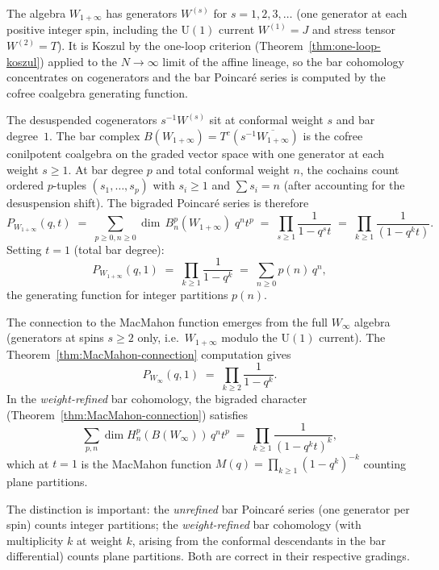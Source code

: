 \begin{computation}
\label{comp:bar-poincare-w1infty}
The algebra $W_{1+\infty}$ has generators $W^{(s)}$ for $s = 1, 2, 3,
\ldots$ (one generator at each positive integer spin, including the
$\mathrm{U}(1)$ current $W^{(1)} = J$ and stress tensor $W^{(2)} = T$).
It is Koszul by the one-loop criterion
(Theorem~\textup{\ref{thm:one-loop-koszul}}) applied to the $N \to
\infty$ limit of the affine lineage, so the bar cohomology concentrates
on cogenerators and the bar Poincar\'{e} series is computed by the
cofree coalgebra generating function.

The desuspended cogenerators $s^{-1}W^{(s)}$ sit at conformal weight
$s$ and bar degree~$1$. The bar complex
$B(W_{1+\infty}) = T^c(s^{-1}\overline{W_{1+\infty}})$ is the cofree
conilpotent coalgebra on the graded vector space with one generator at
each weight $s \ge 1$. At bar degree $p$ and total conformal weight $n$,
the cochains count ordered $p$-tuples $(s_1, \ldots, s_p)$ with
$s_i \ge 1$ and $\sum s_i = n$ (after accounting for the desuspension
shift). The bigraded Poincar\'{e} series is therefore
\begin{equation}\label{eq:bar-poincare-w1infty}
 P_{W_{1+\infty}}(q, t)
 \;=\;
 \sum_{p \ge 0, n \ge 0}
 \dim\, B^p_n(W_{1+\infty})\; q^n t^p
 \;=\;
 \prod_{s \ge 1} \frac{1}{1 - q^s t}
 \;=\;
 \prod_{k \ge 1} \frac{1}{(1 - q^k t)}.
\end{equation}
Setting $t = 1$ (total bar degree):
\[
 P_{W_{1+\infty}}(q, 1)
 \;=\;
 \prod_{k \ge 1} \frac{1}{1 - q^k}
 \;=\;
 \sum_{n \ge 0} p(n)\, q^n,
\]
the generating function for integer partitions $p(n)$.

The connection to the MacMahon function emerges from the full
$W_\infty$ algebra (generators at spins $s \ge 2$ only, i.e.\
$W_{1+\infty}$ modulo the $\mathrm{U}(1)$ current). The
Theorem~\textup{\ref{thm:MacMahon-connection}} computation gives
\[
 P_{W_\infty}(q, 1)
 \;=\;
 \prod_{k \ge 2} \frac{1}{1 - q^k}.
\]
In the \emph{weight-refined} bar cohomology, the bigraded character
(Theorem~\textup{\ref{thm:MacMahon-connection}}) satisfies
\[
 \sum_{p,n} \dim H^p_n(B(W_\infty))\, q^n t^p
 \;=\;
 \prod_{k \ge 1} \frac{1}{(1 - q^k t)^k},
\]
which at $t = 1$ is the MacMahon function $M(q) = \prod_{k \ge 1}
(1 - q^k)^{-k}$ counting plane partitions.

The distinction is important: the \emph{unrefined} bar Poincar\'{e}
series (one generator per spin) counts integer partitions; the
\emph{weight-refined} bar cohomology (with multiplicity $k$ at weight
$k$, arising from the conformal descendants in the bar differential)
counts plane partitions. Both are correct in their respective gradings.
\end{computation}

